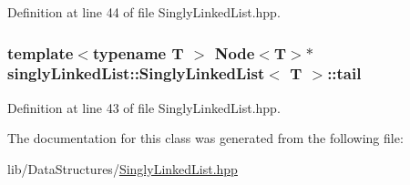 Definition at line 44 of file Singly\-Linked\-List.\-hpp.

\hypertarget{classsinglyLinkedList_1_1SinglyLinkedList_a3f4bd4bcdeaa2bbbe5b7af0d1e1a5ad5}{
\subsubsection[{tail}]{\setlength{\rightskip}{0pt plus 5cm}template$<$typename T $>$ {\bf Node}$<$T$>$$\ast$ {\bf singly\-Linked\-List\-::\-Singly\-Linked\-List}$<$ T $>$\-::tail\hspace{0.3cm}{\ttfamily [private]}}}\label{classsinglyLinkedList_1_1SinglyLinkedList_a3f4bd4bcdeaa2bbbe5b7af0d1e1a5ad5}


Definition at line 43 of file Singly\-Linked\-List.\-hpp.



The documentation for this class was generated from the following file\-:\begin{DoxyCompactItemize}
\item 
lib/\-Data\-Structures/\hyperlink{SinglyLinkedList_8hpp}{Singly\-Linked\-List.\-hpp}\end{DoxyCompactItemize}
